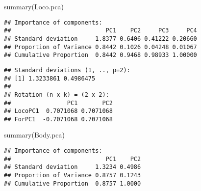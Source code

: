 \documentclass[
]{article}
\newenvironment{Shaded}{\begin{snugshade}}{\end{snugshade}}
\newcommand{\AttributeTok}[1]{\textcolor[rgb]{0.77,0.63,0.00}{#1}}
\newcommand{\ConstantTok}[1]{\textcolor[rgb]{0.00,0.00,0.00}{#1}}
\newcommand{\DecValTok}[1]{\textcolor[rgb]{0.00,0.00,0.81}{#1}}
\newcommand{\DocumentationTok}[1]{\textcolor[rgb]{0.56,0.35,0.01}{\textbf{\textit{#1}}}}
\newcommand{\FunctionTok}[1]{\textcolor[rgb]{0.00,0.00,0.00}{#1}}
\newcommand{\NormalTok}[1]{#1}
\newcommand{\OtherTok}[1]{\textcolor[rgb]{0.56,0.35,0.01}{#1}}
\newcommand{\SpecialCharTok}[1]{\textcolor[rgb]{0.00,0.00,0.00}{#1}}
\begin{document}
\begin{Shaded}
\begin{Highlighting}[]
\FunctionTok{summary}\NormalTok{(Loco.pca)}
\end{Highlighting}
\end{Shaded}

\begin{verbatim}
## Importance of components:
##                           PC1    PC2     PC3     PC4
## Standard deviation     1.8377 0.6406 0.41222 0.20660
## Proportion of Variance 0.8442 0.1026 0.04248 0.01067
## Cumulative Proportion  0.8442 0.9468 0.98933 1.00000
\end{verbatim}

\begin{Shaded}
\end{Shaded}

\begin{verbatim}
## Standard deviations (1, .., p=2):
## [1] 1.3233861 0.4986475
## 
## Rotation (n x k) = (2 x 2):
##                PC1       PC2
## LocoPC1  0.7071068 0.7071068
## ForPC1  -0.7071068 0.7071068
\end{verbatim}

\begin{Shaded}
\begin{Highlighting}[]
\FunctionTok{summary}\NormalTok{(Body.pca)}
\end{Highlighting}
\end{Shaded}

\begin{verbatim}
## Importance of components:
##                           PC1    PC2
## Standard deviation     1.3234 0.4986
## Proportion of Variance 0.8757 0.1243
## Cumulative Proportion  0.8757 1.0000
\end{verbatim}
\end{document}

